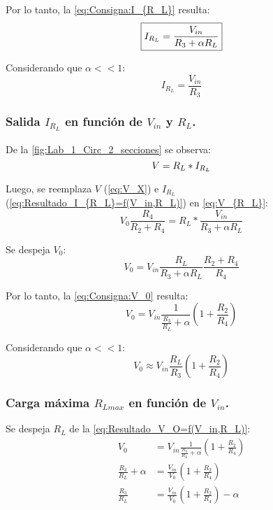 Por lo tanto, la \autoref{eq:Consigna:I_{R_L}} resulta:
\begin{equation}
    \boxed{I_{R_L}=\frac{V_{in}}{R_3+\alpha R_L}}
    \label{eq:Resultado_I_{R_L}=f(V_in,R_L)}
\end{equation}

Considerando que $\alpha<<1$:
\begin{equation}
    \boxed{I_{R_L}=\frac{V_{in}}{R_3}}
\end{equation}


\subsubsection{Salida $I_{R_L}$ en función de $V_{in}$ y $R_L$.}

De la \autoref{fig:Lab_1_Circ_2_secciones} se observa:
\begin{equation}
    V=R_L*I_{R_L}
    \label{eq:V_{R_L}}
\end{equation}

Luego, se reemplaza $V$ (\autoref{eq:V_X}) e $I_{R_L}$ (\autoref{eq:Resultado_I_{R_L}=f(V_in,R_L)}) en \autoref{eq:V_{R_L}}:
\begin{equation*}
    V_0\frac{R_4}{R_2+R_4}=R_L*\frac{V_{in}}{R_3+\alpha R_L}
\end{equation*}

Se despeja $V_0$:
\begin{equation*}
    V_0=V_{in}\frac{R_L}{R_3+\alpha R_L}\frac{R_2+R_4}{R_4}
\end{equation*}

Por lo tanto, la \autoref{eq:Consigna:V_0} resulta:
\begin{equation}
    \boxed{V_0=V_{in}\frac{1}{\frac{R_3}{R_L}+\alpha}\left(1+\frac{R_2}{R_4}\right)}
    \label{eq:Resultado_V_O=f(V_in,R_L)}
\end{equation}

Considerando que $\alpha<<1$:
\begin{equation}
    \boxed{V_0 \approx V_{in}\frac{R_L}{R_3}\left(1+\frac{R_2}{R_4}\right)}
    \label{eq:Resultado_V_O=f(V_in,R_L)_bis}
\end{equation}

\subsubsection{Carga máxima $R_{Lmax}$ en función de $V_{in}$.}

Se despeja $R_L$ de la \autoref{eq:Resultado_V_O=f(V_in,R_L)}:
\begin{align*}
    V_0 &= V_{in}\frac{1}{\frac{R_3}{R_L}+\alpha}\left(1+\frac{R_2}{R_4}\right) \\
    \frac{R_3}{R_L}+\alpha &= \frac{V_{in}}{V_0}\left(1+\frac{R_2}{R_4}\right) \\
    \frac{R_3}{R_L} &= \frac{V_{in}}{V_0}\left(1+\frac{R_2}{R_4}\right)-\alpha
\end{align*}

